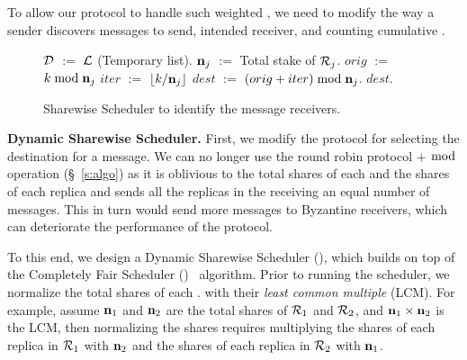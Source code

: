 To allow our \Scrooge{} protocol to handle such weighted \RSM{}, we need to modify 
the way a sender discovers messages to send, intended receiver, and counting cumulative \quack{}.

\begin{figure}[t]
    \begin{myprotocol}
	\vspace{1mm}

		\STATE $\mathcal{D}$ $:=$ $\mathcal{L}$ (Temporary list).
            \STATE $\textbf{n}_{j}$ $:=$ Total stake of $\mathcal{R}_{j}$.
            \STATE $orig$ $:=$ $k \bmod \textbf{n}_{j}$
            \STATE $iter$ $:=$ $\lfloor k / \textbf{n}_{j} \rfloor$
            \STATE $dest$ $:=$ $(orig + iter) \bmod \textbf{n}_{j}$.
		 $dest$.
	\ENDFUNC
	\SPACE
    \end{myprotocol}
    \caption{Sharewise Scheduler to identify the message receivers.}
    \label{func:sws}
\end{figure}



{\bf Dynamic Sharewise Scheduler.}
First, we modify the protocol for selecting the destination for a message. 
We can no longer use the round robin protocol $+$ $\bmod$ operation (\S~\ref{s:algo}) 
as it is oblivious to the total shares of each \RSM{} and the shares of each replica and 
sends all the replicas in the receiving \RSM{} an equal number of messages.
This in turn would send more messages to Byzantine receivers, which can deteriorate the 
performance of the \Scrooge{} protocol.

To this end, we design a Dynamic Sharewise Scheduler (\SWS), which builds on top of the 
Completely Fair Scheduler (\CFS{})~\cite{cfs} algorithm.
Prior to running the \SWS{} scheduler, we normalize the total shares of each \RSM{}. 
with their {\em least common multiple} (LCM). 
For example, assume $\textbf{n}_{1}$ and $\textbf{n}_{2}$ are the total shares of \RSM{} $\mathcal{R}_{1}$ and $\mathcal{R}_{2}$, 
and $\textbf{n}_{1}\times\textbf{n}_{2}$ is the LCM, then normalizing the shares requires multiplying 
the shares of each replica in $\mathcal{R}_{1}$ with $\textbf{n}_{2}$ and the shares of each replica in $\mathcal{R}_{2}$ with $\textbf{n}_{1}$.

